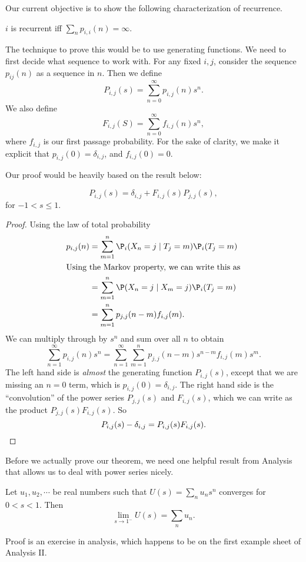 \documentclass[a4paper]{article}
\begin{document}
Our current objective is to show the following characterization of recurrence.
\begin{thm}
  $i$ is recurrent iff $\sum_n p_{i, i}(n) = \infty$.
\end{thm}
The technique to prove this would be to use generating functions. We need to first decide what sequence to work with. For any fixed $i, j$, consider the sequence $p_{ij}(n)$ as a sequence in $n$. Then we define
\[
  P_{i, j}(s) = \sum_{n = 0}^\infty p_{i, j}(n) s^n.
\]
We also define
\[
  F_{i, j}(S) = \sum_{n = 0}^\infty f_{i, j}(n) s^n,
\]
where $f_{i, j}$ is our first passage probability. For the sake of clarity, we make it explicit that $p_{i, j}(0) = \delta_{i, j}$, and $f_{i, j}(0) = 0$.

Our proof would be heavily based on the result below:
\begin{thm}
  \[
    P_{i, j}(s) = \delta_{i, j} + F_{i, j}(s)P_{j, j}(s),
  \]
  for $-1 < s \leq 1$.
\end{thm}

\begin{proof}
  Using the law of total probability
  \begin{align*}
    p_{i, j}(n) &= \sum_{m = 1}^n \P_i(X_n = j\mid T_j = m) \P_i(T_j = m) \\
    \intertext{Using the Markov property, we can write this as}
    &= \sum_{m = 1}^n \P(X_n = j\mid X_m = j) \P_i(T_j = m)\\
    &= \sum_{m = 1}^n p_{j, j}(n - m) f_{i, j}(m).
  \end{align*}
  We can multiply through by $s^n$ and sum over all $n$ to obtain
  \[
    \sum_{n = 1}^\infty p_{i, j}(n) s^n = \sum_{n = 1}^\infty \sum_{m = 1}^n p_{j, j}(n - m)s^{n - m} f_{i, j}(m)s^m.
  \]
  The left hand side is \emph{almost} the generating function $P_{i, j}(s)$, except that we are missing an $n = 0$ term, which is $p_{i, j}(0) = \delta_{i, j}$. The right hand side is the ``convolution'' of the power series $P_{j, j}(s)$ and $F_{i, j}(s)$, which we can write as the product $P_{j, j}(s) F_{i, j}(s)$. So
  \[
    P_{i, j}(s) - \delta_{i, j} = P_{i, j}(s) F_{i, j}(s).\qedhere
  \]
\end{proof}

Before we actually prove our theorem, we need one helpful result from Analysis that allows us to deal with power series nicely.
\begin{lemma}
  Let $u_1, u_2, \cdots$ be real numbers such that $U(s) = \sum_{n} u_n s^n$ converges for $0 < s < 1$. Then
  \[
    \lim_{s\to 1^-} U(s) = \sum_n u_n.
  \]
\end{lemma}
Proof is an exercise in analysis, which happens to be on the first example sheet of Analysis II.
\end{document}
